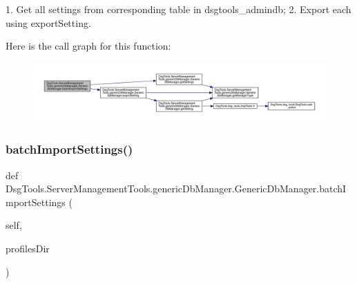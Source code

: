 \begin{DoxyVerb}1. Get all settings from corresponding table in dsgtools_admindb;
2. Export each using exportSetting.
\end{DoxyVerb}
 Here is the call graph for this function\+:
\nopagebreak
\begin{figure}[H]
\begin{center}
\leavevmode
\includegraphics[width=350pt]{class_dsg_tools_1_1_server_management_tools_1_1generic_db_manager_1_1_generic_db_manager_a819e748ac71d827bb50ce8cebb322187_cgraph}
\end{center}
\end{figure}
\mbox{\label{class_dsg_tools_1_1_server_management_tools_1_1generic_db_manager_1_1_generic_db_manager_aa7249fe469bbc7c88dc94c83100d682b}} 
\subsubsection{\texorpdfstring{batch\+Import\+Settings()}{batchImportSettings()}}
{\footnotesize\ttfamily def Dsg\+Tools.\+Server\+Management\+Tools.\+generic\+Db\+Manager.\+Generic\+Db\+Manager.\+batch\+Import\+Settings (\begin{DoxyParamCaption}\item[{}]{self,  }\item[{}]{profiles\+Dir }\end{DoxyParamCaption})}

